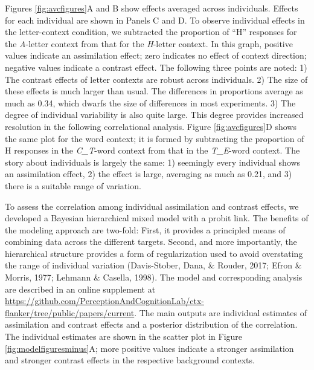 \documentclass[english,floatsintext,man]{apa6}
\theoremstyle{definition}
\theoremstyle{definition}
\theoremstyle{definition}
\theoremstyle{remark}
\begin{document}
Figures \ref{fig:avcfigures}A and B show effects averaged across
individuals. Effects for each individual are shown in Panels C and D. To
observe individual effects in the letter-context condition, we
subtracted the proportion of \enquote{H} responses for the
\emph{A}-letter context from that for the \emph{H}-letter context. In
this graph, positive values indicate an assimilation effect; zero
indicates no effect of context direction; negative values indicate a
contrast effect. The following three points are noted: 1) The contrast
effects of letter contexts are robust across individuals. 2) The size of
these effects is much larger than usual. The differences in proportions
average as much as 0.34, which dwarfs the size of differences in most
experiments. 3) The degree of individual variability is also quite
large. This degree provides increased resolution in the following
correlational analysis. Figure \ref{fig:avcfigures}D shows the same plot
for the word context; it is formed by subtracting the proportion of H
responses in the \emph{C\_T}-word context from that in the
\emph{T\_E}-word context. The story about individuals is largely the
same: 1) seemingly every individual shows an assimilation effect, 2) the
effect is large, averaging as much as 0.21, and 3) there is a suitable
range of variation.

To assess the correlation among individual assimilation and contrast
effects, we developed a Bayesian hierarchical mixed model with a probit
link. The benefits of the modeling approach are two-fold: First, it
provides a principled means of combining data across the different
targets. Second, and more importantly, the hierarchical structure
provides a form of regularization used to avoid overstating the range of
individual variation (Davis-Stober, Dana, \& Rouder, 2017; Efron \&
Morris, 1977; Lehmann \& Casella, 1998). The model and corresponding
analysis are described in an online supplement at
\url{https://github.com/PerceptionAndCognitionLab/ctx-flanker/tree/public/papers/current}.
The main outputs are individual estimates of assimilation and contrast
effects and a posterior distribution of the correlation. The individual
estimates are shown in the scatter plot in Figure
\ref{fig:modelfiguresminus}A; more positive values indicate a stronger
assimilation and stronger contrast effects in the respective background
contexts.
\end{document}
